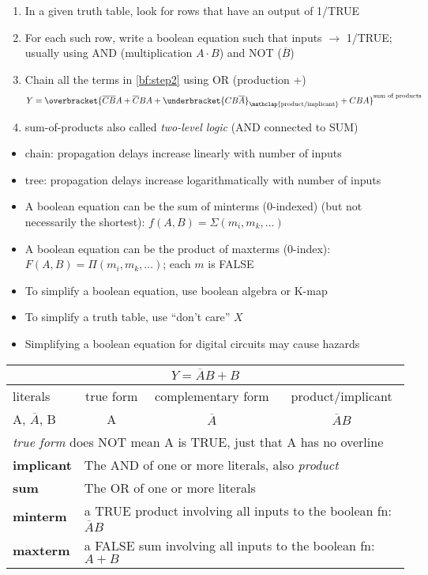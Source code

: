 \begin{enumerate}
\item In a given truth table, look for rows that have an output of 1/TRUE
\item\label{bf:step2} For each such row, write a boolean equation such that inputs $\rightarrow$ 1/TRUE; usually using AND (multiplication $A\cdot B$) and NOT ($\overline{B}$)
\item Chain all the terms in \ref{bf:step2} using OR (production +)
  \[
Y = \overbracket{\overline{C}\overline{B}A + \overline{C}BA + \underbracket{CB\overline{A}}_{\mathclap{\text{product/implicant}}} + CBA}^{\text{sum of products}}
  \]
\item sum-of-products also called \emph{two-level logic} (AND connected to SUM)
\end{enumerate}
\begin{itemize}
\item chain: propagation delays increase linearly with number of inputs
\item tree: propagation delays increase logarithmatically with number of inputs
\item A boolean equation can be the sum of minterms (0-indexed) (but not necessarily the shortest): $f(A,B) = \Sigma(m_{i},m_{k},\ldots)$
\item A boolean equation can be the product of maxterms (0-index): $F(A,B) = \Pi(m_{i},m_{k},\ldots)$; each $m$ is FALSE
\item To simplify a boolean equation, use boolean algebra or K-map
\item To simplify a truth table, use ``don't care'' $X$
\item Simplifying a boolean equation for digital circuits may cause hazards
\end{itemize}

\begin{tabular}{l|c|c|c}
  \hline
  \multicolumn{4}{c}{$Y = \overline{A}B + B$} \\
  \hline
  literals & true form & complementary form & product/implicant \\
  \hline
  A, $\overline{A}$, B & A & $\overline{A}$ & $\overline{A}B$\\
  \hline
  \multicolumn{4}{l}{\emph{true form} does NOT mean A is TRUE, just that A has no overline} \\
  \hline
  \textbf{implicant} & \multicolumn{3}{l}{The AND of one or more literals, also \emph{product} } \\
  \textbf{sum} & \multicolumn{3}{l}{The OR of one or more literals} \\
  \textbf{minterm} & \multicolumn{3}{l}{a TRUE product involving all inputs to the boolean fn: $\overline{A}B$}\\
  \textbf{maxterm} & \multicolumn{3}{l}{a FALSE sum involving all inputs to the boolean fn: $A + B$}\\
  \hline
\end{tabular}
